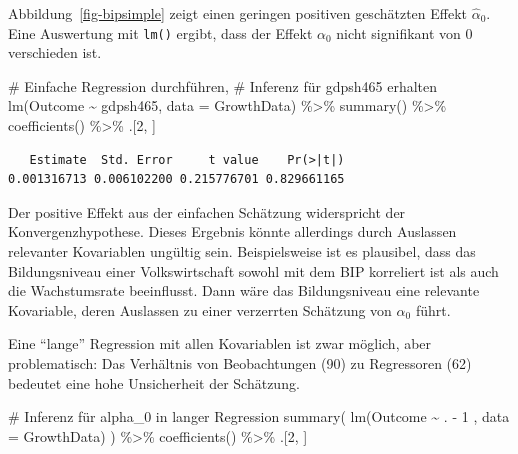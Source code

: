 \documentclass[
  a4paper,
  DIV=11,
  oneside]{scrreprt}
\newenvironment{Shaded}{\begin{snugshade}}{\end{snugshade}}
\newcommand{\AttributeTok}[1]{\textcolor[rgb]{0.40,0.45,0.13}{#1}}
\newcommand{\CommentTok}[1]{\textcolor[rgb]{0.37,0.37,0.37}{#1}}
\newcommand{\DecValTok}[1]{\textcolor[rgb]{0.68,0.00,0.00}{#1}}
\newcommand{\FunctionTok}[1]{\textcolor[rgb]{0.28,0.35,0.67}{#1}}
\newcommand{\NormalTok}[1]{\textcolor[rgb]{0.00,0.23,0.31}{#1}}
\newcommand{\SpecialCharTok}[1]{\textcolor[rgb]{0.37,0.37,0.37}{#1}}
\begin{document}
Abbildung~\ref{fig-bipsimple} zeigt einen geringen positiven geschätzten
Effekt \(\widehat{\alpha}_0\). Eine Auswertung mit \texttt{lm()} ergibt,
dass der Effekt \(\alpha_0\) nicht signifikant von \(0\) verschieden
ist.

\begin{Shaded}
\begin{Highlighting}[]
\CommentTok{\# Einfache Regression durchführen, }
\CommentTok{\# Inferenz für gdpsh465 erhalten}
\FunctionTok{lm}\NormalTok{(Outcome }\SpecialCharTok{\textasciitilde{}}\NormalTok{ gdpsh465, }\AttributeTok{data =}\NormalTok{ GrowthData) }\SpecialCharTok{\%\textgreater{}\%}
  \FunctionTok{summary}\NormalTok{() }\SpecialCharTok{\%\textgreater{}\%}
  \FunctionTok{coefficients}\NormalTok{() }\SpecialCharTok{\%\textgreater{}\%} 
\NormalTok{  .[}\DecValTok{2}\NormalTok{, ]}
\end{Highlighting}
\end{Shaded}

\begin{verbatim}
   Estimate  Std. Error     t value    Pr(>|t|) 
0.001316713 0.006102200 0.215776701 0.829661165 
\end{verbatim}

Der positive Effekt aus der einfachen Schätzung widerspricht der
Konvergenzhypothese. Dieses Ergebnis könnte allerdings durch Auslassen
relevanter Kovariablen ungültig sein. Beispielsweise ist es plausibel,
dass das Bildungsniveau einer Volkswirtschaft sowohl mit dem BIP
korreliert ist als auch die Wachstumsrate beeinflusst. Dann wäre das
Bildungsniveau eine relevante Kovariable, deren Auslassen zu einer
verzerrten Schätzung von \(\alpha_0\) führt.

Eine ``lange'' Regression mit allen Kovariablen ist zwar möglich, aber
problematisch: Das Verhältnis von Beobachtungen (90) zu Regressoren (62)
bedeutet eine hohe Unsicherheit der Schätzung.

\begin{Shaded}
\begin{Highlighting}[]
\CommentTok{\# Inferenz für alpha\_0 in langer Regression}
\FunctionTok{summary}\NormalTok{(}
  \FunctionTok{lm}\NormalTok{(Outcome }\SpecialCharTok{\textasciitilde{}}\NormalTok{ . }\SpecialCharTok{{-}} \DecValTok{1}\NormalTok{ , }\AttributeTok{data =}\NormalTok{ GrowthData)}
\NormalTok{  ) }\SpecialCharTok{\%\textgreater{}\%} 
  \FunctionTok{coefficients}\NormalTok{() }\SpecialCharTok{\%\textgreater{}\%} 
\NormalTok{  .[}\DecValTok{2}\NormalTok{, ]}
\end{Highlighting}
\end{Shaded}
\end{document}
